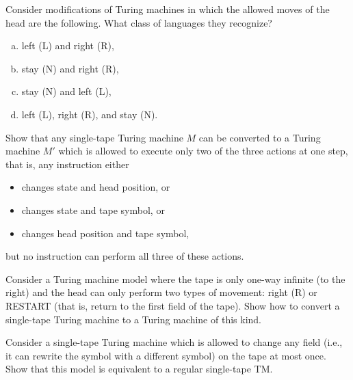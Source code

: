 \documentclass[a4paper,12pt]{amsart}
\begin{document}
\begin{problem}
    
    Consider modifications of Turing machines in which the allowed moves of the head are the following. What class of languages they recognize?
    \begin{multicols}{2}
        \begin{enumerate}[(a)]
            \item left (L) and right (R),
            \item stay (N) and right (R),
            \item stay (N) and left (L),
            \item left (L), right (R), and stay (N).
        \end{enumerate}    
    \end{multicols}

\end{problem}


\begin{problem}

    Show that any single-tape Turing machine $M$ can be converted to a Turing machine $M'$ which is allowed to execute only two of the three actions at one step, that is, any instruction either 
    \begin{itemize}
        \item changes state and head position, or
        \item changes state and tape symbol, or
        \item changes head position and tape symbol,
    \end{itemize}
    but no instruction can perform all three of these actions.

\end{problem}


\begin{problem}
    Consider a Turing machine model where the tape is only one-way infinite (to the right) and the head can only perform two types of movement:  right (R) or RESTART (that is, return to the first field of the tape). Show how to convert a single-tape Turing machine to a Turing machine of this kind.
\end{problem}
        

\begin{problem}

    Consider a single-tape Turing machine which is allowed to change any field (i.e., it can rewrite the symbol with a different symbol) on the tape at most once. Show that this model is equivalent to a regular single-tape TM.

\end{problem}
    
\end{document}
